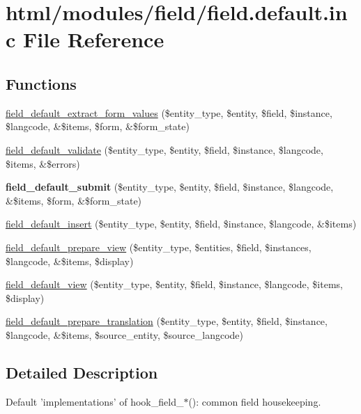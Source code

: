 \hypertarget{field_8default_8inc}{
\section{html/modules/field/field.default.inc File Reference}
\label{field_8default_8inc}
}
\subsection*{Functions}
\begin{DoxyCompactItemize}
\item 
\hyperlink{field_8default_8inc_af49a2ff85415c7a71362387e849ba28d}{field\_\-default\_\-extract\_\-form\_\-values} (\$entity\_\-type, \$entity, \$field, \$instance, \$langcode, \&\$items, \$form, \&\$form\_\-state)
\item 
\hyperlink{field_8default_8inc_a22b00edd6421db4d6b3c8d76e7cfa514}{field\_\-default\_\-validate} (\$entity\_\-type, \$entity, \$field, \$instance, \$langcode, \$items, \&\$errors)
\item 
\hypertarget{field_8default_8inc_a8e44c960eea7faa97d7497640ac98e2e}{
{\bfseries field\_\-default\_\-submit} (\$entity\_\-type, \$entity, \$field, \$instance, \$langcode, \&\$items, \$form, \&\$form\_\-state)}
\label{field_8default_8inc_a8e44c960eea7faa97d7497640ac98e2e}

\item 
\hyperlink{field_8default_8inc_a2948e1001ff0b624c8c367589b1c8eaa}{field\_\-default\_\-insert} (\$entity\_\-type, \$entity, \$field, \$instance, \$langcode, \&\$items)
\item 
\hyperlink{field_8default_8inc_a086fc3e89741c1ba19cc269191d627e5}{field\_\-default\_\-prepare\_\-view} (\$entity\_\-type, \$entities, \$field, \$instances, \$langcode, \&\$items, \$display)
\item 
\hyperlink{field_8default_8inc_a804bfc6de7277945228d4949f82bc429}{field\_\-default\_\-view} (\$entity\_\-type, \$entity, \$field, \$instance, \$langcode, \$items, \$display)
\item 
\hyperlink{field_8default_8inc_ad6fb9a8915e3da542894cf88483849ca}{field\_\-default\_\-prepare\_\-translation} (\$entity\_\-type, \$entity, \$field, \$instance, \$langcode, \&\$items, \$source\_\-entity, \$source\_\-langcode)
\end{DoxyCompactItemize}


\subsection{Detailed Description}
Default 'implementations' of hook\_\-field\_\-$\ast$(): common field housekeeping.

